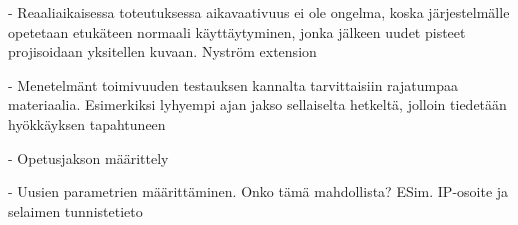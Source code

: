 - Reaaliaikaisessa toteutuksessa aikavaativuus ei ole ongelma, koska järjestelmälle opetetaan etukäteen normaali käyttäytyminen, jonka jälkeen
uudet pisteet projisoidaan yksitellen kuvaan. Nyström extension

- Menetelmänt toimivuuden testauksen kannalta tarvittaisiin rajatumpaa materiaalia. Esimerkiksi lyhyempi ajan jakso sellaiselta hetkeltä, jolloin
 tiedetään hyökkäyksen tapahtuneen

- Opetusjakson määrittely

- Uusien parametrien määrittäminen. Onko tämä mahdollista? ESim. IP-osoite ja selaimen tunnistetieto
